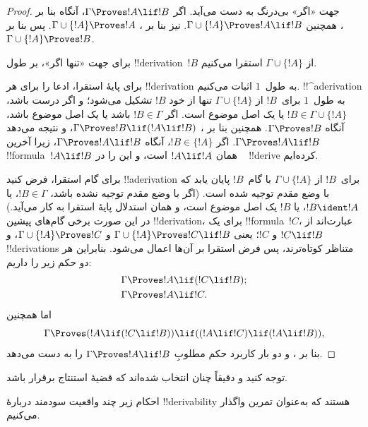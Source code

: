 \documentclass[../../../include/open-logic-section]{subfiles}
\begin{document}
\begin{proof}
جهت «اگر» بی‌درنگ به دست می‌آید. اگر $\Gamma \Proves !A \lif !B$،
آنگاه بنا بر  همچنین
$\Gamma \cup \{!A\} \Proves !A \lif !B$. نیز بنا بر
، $\Gamma \cup \{!A\} \Proves !A$. پس
بنا بر ، $\Gamma \cup \{!A\} \Proves !B$.

برای جهت «تنها اگر»، بر طول !!{derivation}~$!B$ از
$\Gamma \cup \{!A\}$ استقرا می‌کنیم.

برای پایهٔ استقرا، ادعا را برای هر !!{derivation} به طول~$1$ اثبات
می‌کنیم. !!^a{derivation} به طول~$1$ برای~$!B$ از
$\Gamma \cup \{!A\}$ تنها از خود $!B$ تشکیل می‌شود؛ و اگر درست باشد،
$!B \in \Gamma \cup \{!A\}$ یا یک اصل موضوع است. اگر
  $!B \in \Gamma$ باشد یا یک اصل موضوع باشد، آنگاه
$\Gamma \Proves !B$. همچنین بنا بر ،
$\Gamma \Proves !B \lif (!A \lif !B)$، و  نتیجه می‌دهد
$\Gamma \Proves !A \lif !B$. اگر $!B \in \{ !A\}$، آنگاه
$\Gamma \Proves !A \lif !B$، زیرا آخرین !!{formula}~$!A \lif !B$
همان $!A \lif !A$ است، و این را در ~
!!{derive} کرده‌ایم.

برای گام استقرا، فرض کنید !!a{derivation} برای~$!B$ از
$\Gamma \cup \{!A\}$ با گام~$!B$ پایان یابد که با وضع مقدم توجیه شده
است. (اگر با وضع مقدم توجیه نشده باشد، $!B \in \Gamma$، یا
$!B \ident !A$، یا $!B$ یک اصل موضوع است، و همان استدلال پایهٔ استقرا
به کار می‌آید.) در این صورت برخی گام‌های پیشین !!{derivation}، برای
یک !!{formula}~$!C$، عبارت‌اند از $!C \lif !B$ و $!C$؛ یعنی
$\Gamma \cup \{!A\} \Proves !C \lif !B$ و
$\Gamma \cup \{!A\} \Proves !C$، و !!{derivation}s متناظر کوتاه‌ترند،
پس فرض استقرا بر آن‌ها اعمال می‌شود. بنابراین هر دو حکم زیر را داریم:
\begin{align*}
  & \Gamma \Proves !A \lif (!C \lif !B); \\
  & \Gamma \Proves !A \lif !C.
\end{align*}
اما همچنین
\[
\Gamma \Proves (!A \lif (!C \lif !B)) \lif
((!A\lif !C)  \lif (!A \lif !B)),
\]
بنا بر ، و دو بار کاربرد  حکم مطلوبِ
$\Gamma \Proves !A \lif !B$ را به دست می‌دهد.
\end{proof}

توجه کنید  و  دقیقاً چنان
انتخاب شده‌اند که قضیهٔ استنتاج برقرار باشد.

احکام زیر چند واقعیت سودمند دربارهٔ !!{derivability} هستند که به‌عنوان
تمرین واگذار می‌کنیم.
\end{document}
